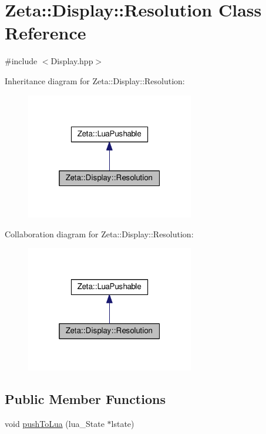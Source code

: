 \hypertarget{classZeta_1_1Display_1_1Resolution}{\section{Zeta\+:\+:Display\+:\+:Resolution Class Reference}
\label{classZeta_1_1Display_1_1Resolution}
}


{\ttfamily \#include $<$Display.\+hpp$>$}



Inheritance diagram for Zeta\+:\+:Display\+:\+:Resolution\+:\nopagebreak
\begin{figure}[H]
\begin{center}
\leavevmode
\includegraphics[width=208pt]{classZeta_1_1Display_1_1Resolution__inherit__graph}
\end{center}
\end{figure}


Collaboration diagram for Zeta\+:\+:Display\+:\+:Resolution\+:\nopagebreak
\begin{figure}[H]
\begin{center}
\leavevmode
\includegraphics[width=208pt]{classZeta_1_1Display_1_1Resolution__coll__graph}
\end{center}
\end{figure}
\subsection*{Public Member Functions}
\begin{DoxyCompactItemize}
\item 
void \hyperlink{classZeta_1_1Display_1_1Resolution_a19b4a389898dc9e2c499f921396f0aab}{push\+To\+Lua} (lua\+\_\+\+State $\ast$lstate)
\end{DoxyCompactItemize}
